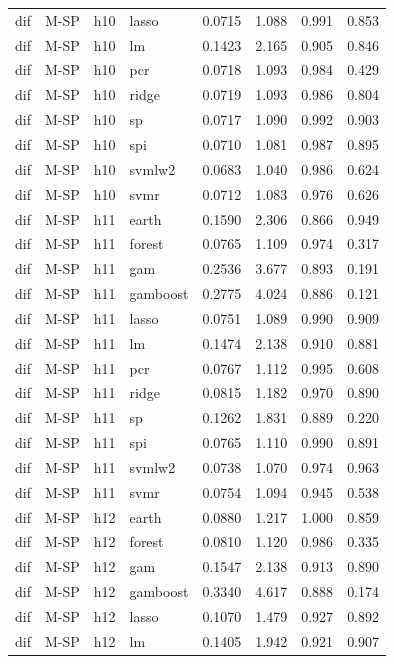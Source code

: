 \begin{ThreePartTable}
\begin{longtable}[t]{llclcccc}
dif & M-SP & h10 & lasso & 0.0715 & 1.088 & 0.991 & 0.853\\
dif & M-SP & h10 & lm & 0.1423 & 2.165 & 0.905 & 0.846\\
dif & M-SP & h10 & pcr & 0.0718 & 1.093 & 0.984 & 0.429\\
dif & M-SP & h10 & ridge & 0.0719 & 1.093 & 0.986 & 0.804\\
dif & M-SP & h10 & sp & 0.0717 & 1.090 & 0.992 & 0.903\\
dif & M-SP & h10 & spi & 0.0710 & 1.081 & 0.987 & 0.895\\
dif & M-SP & h10 & svmlw2 & 0.0683 & 1.040 & 0.986 & 0.624\\
dif & M-SP & h10 & svmr & 0.0712 & 1.083 & 0.976 & 0.626\\
\addlinespace
dif & M-SP & h11 & earth & 0.1590 & 2.306 & 0.866 & 0.949\\
dif & M-SP & h11 & forest & 0.0765 & 1.109 & 0.974 & 0.317\\
dif & M-SP & h11 & gam & 0.2536 & 3.677 & 0.893 & 0.191\\
dif & M-SP & h11 & gamboost & 0.2775 & 4.024 & 0.886 & 0.121\\
dif & M-SP & h11 & lasso & 0.0751 & 1.089 & 0.990 & 0.909\\
dif & M-SP & h11 & lm & 0.1474 & 2.138 & 0.910 & 0.881\\
dif & M-SP & h11 & pcr & 0.0767 & 1.112 & 0.995 & 0.608\\
dif & M-SP & h11 & ridge & 0.0815 & 1.182 & 0.970 & 0.890\\
dif & M-SP & h11 & sp & 0.1262 & 1.831 & 0.889 & 0.220\\
dif & M-SP & h11 & spi & 0.0765 & 1.110 & 0.990 & 0.891\\
dif & M-SP & h11 & svmlw2 & 0.0738 & 1.070 & 0.974 & 0.963\\
dif & M-SP & h11 & svmr & 0.0754 & 1.094 & 0.945 & 0.538\\
\addlinespace
dif & M-SP & h12 & earth & 0.0880 & 1.217 & 1.000 & 0.859\\
dif & M-SP & h12 & forest & 0.0810 & 1.120 & 0.986 & 0.335\\
dif & M-SP & h12 & gam & 0.1547 & 2.138 & 0.913 & 0.890\\
dif & M-SP & h12 & gamboost & 0.3340 & 4.617 & 0.888 & 0.174\\
dif & M-SP & h12 & lasso & 0.1070 & 1.479 & 0.927 & 0.892\\
dif & M-SP & h12 & lm & 0.1405 & 1.942 & 0.921 & 0.907\\

\end{longtable}
\end{ThreePartTable}
